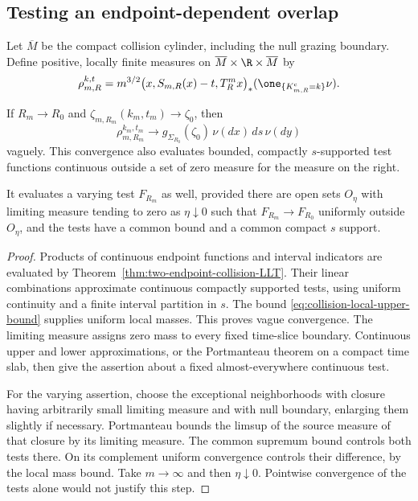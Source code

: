 \subsection{Testing an endpoint-dependent overlap}
Let $\overline M$ be the compact collision cylinder, including the
null grazing boundary. Define positive, locally finite measures on
$\overline M\times\R\times\overline M$ by
\begin{equation}\label{eq:collision-local-source-measure}
 \rho_{m,R}^{k,t}
 =m^{3/2}\bigl(x,S_{m,R}(x)-t,T_R^m x\bigr)_*
                     (\one_{\{K^{\rm c}_{m,R}=k\}}\nu).
\end{equation}
\begin{corollary}
\label{cor:local-endpoint-measures}
If $R_m\to R_0$ and $\zeta_{m,R_m}(k_m,t_m)\to\zeta_0$, then
\begin{equation}\label{eq:collision-local-source-limit}
 \rho_{m,R_m}^{k_m,t_m}\longrightarrow
       g_{\Sigma_{R_0}}(\zeta_0)\,\nu(dx)\,ds\,\nu(dy)
\end{equation}
vaguely. This convergence also evaluates bounded, compactly
$s$-supported test functions continuous outside a set of zero measure
for the measure on the right.

It evaluates a varying test $F_{R_m}$ as well, provided there are open
sets $O_\eta$ with limiting measure tending to zero as $\eta\downarrow0$
such that $F_{R_m}\to F_{R_0}$ uniformly outside $O_\eta$, and the
tests have a common bound and a common compact $s$ support.
\end{corollary}
\begin{proof}
Products of continuous endpoint functions and interval indicators are
evaluated by Theorem~\ref{thm:two-endpoint-collision-LLT}. Their linear
combinations approximate continuous compactly supported tests, using
uniform continuity and a finite interval partition in $s$. The bound
\eqref{eq:collision-local-upper-bound} supplies uniform local masses.
This proves vague convergence. The limiting measure assigns zero mass
to every fixed time-slice boundary. Continuous upper and lower
approximations, or the Portmanteau theorem on a compact time slab,
then give the assertion about a fixed almost-everywhere continuous
test.

For the varying assertion, choose the exceptional neighborhoods with
closure having arbitrarily small limiting measure and with null
boundary, enlarging them slightly if necessary. Portmanteau bounds the
limsup of the source measure of that closure by its limiting measure.
The common supremum bound controls both tests there. On its complement
uniform convergence controls their difference, by the local mass bound.
Take $m\to\infty$ and then $\eta\downarrow0$. Pointwise convergence
of the tests alone would not justify this step.
\end{proof}
